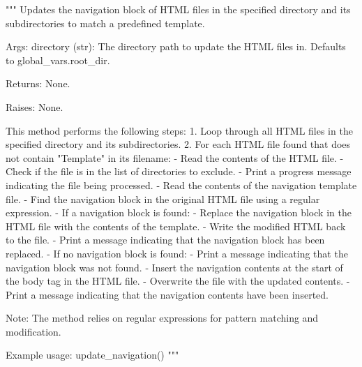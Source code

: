 \begin{codebox}[MMORPDND.update\_navigation(self, directory=global\_vars.root\_dir)]
"""
Updates the navigation block of HTML files in the specified directory and its subdirectories to match a predefined template.

Args:
	directory (str): The directory path to update the HTML files in. Defaults to global_vars.root_dir.

Returns:
	None.

Raises:
	None.

This method performs the following steps:
	1. Loop through all HTML files in the specified directory and its subdirectories.
	2. For each HTML file found that does not contain "Template" in its filename:
		- Read the contents of the HTML file.
		- Check if the file is in the list of directories to exclude.
		- Print a progress message indicating the file being processed.
		- Read the contents of the navigation template file.
		- Find the navigation block in the original HTML file using a regular expression.
		- If a navigation block is found:
		- Replace the navigation block in the HTML file with the contents of the template.
		- Write the modified HTML back to the file.
		- Print a message indicating that the navigation block has been replaced.
		- If no navigation block is found:
		- Print a message indicating that the navigation block was not found.
		- Insert the navigation contents at the start of the body tag in the HTML file.
		- Overwrite the file with the updated contents.
		- Print a message indicating that the navigation contents have been inserted.

Note: 
	The method relies on regular expressions for pattern matching and modification.

Example usage:
	update_navigation()
"""
\end{codebox}


